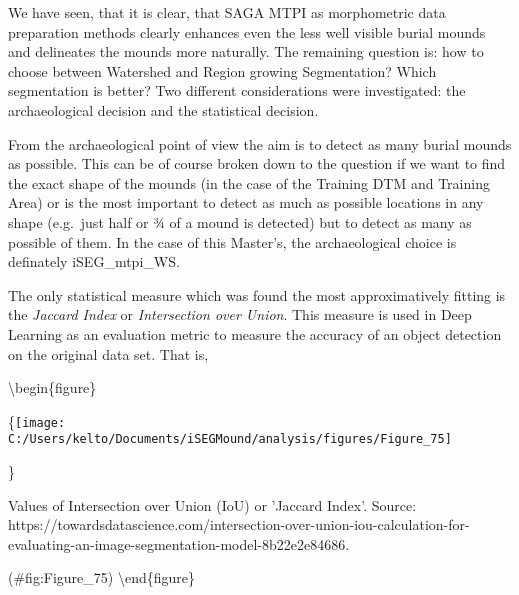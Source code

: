 \documentclass[
]{article}
\begin{document}
We have seen, that it is clear, that SAGA MTPI as morphometric data preparation methods clearly enhances even the less well visible burial mounds and delineates the mounds more naturally. The remaining question is: how to choose between Watershed and Region growing Segmentation? Which segmentation is better? Two different considerations were investigated: the archaeological decision and the statistical decision.

From the archaeological point of view the aim is to detect as many burial mounds as possible. This can be of course broken down to the question if we want to find the exact shape of the mounds (in the case of the Training DTM and Training Area) or is the most important to detect as much as possible locations in any shape (e.g.~just half or ¾ of a mound is detected) but to detect as many as possible of them. In the case of this Master's, the archaeological choice is definately iSEG\_mtpi\_WS.

The only statistical measure which was found the most approximatively fitting is the \emph{Jaccard Index} or \emph{Intersection over Union}. This measure is used in Deep Learning as an evaluation metric to measure the accuracy of an object detection on the original data set. That is,

\textbackslash begin\{figure\}

\{\centering \texttt{[image: C:/Users/kelto/Documents/iSEGMound/analysis/figures/Figure\_75]}

\}

\caption{Values of Intersection over Union (IoU) or 'Jaccard Index'. Source: https://towardsdatascience.com/intersection-over-union-iou-calculation-for-evaluating-an-image-segmentation-model-8b22e2e84686.}

(\#fig:Figure\_75)
\textbackslash end\{figure\}
\end{document}

